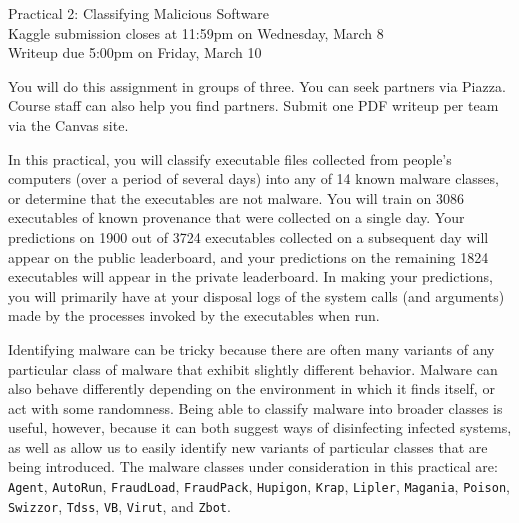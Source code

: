 \documentclass[12pt]{article}
\begin{document}
\begin{center}
{\Large Practical 2: Classifying Malicious Software}\\
Kaggle submission closes at 11:59pm on Wednesday, March 8\\
Writeup due 5:00pm on Friday, March 10
\end{center}

You will do this assignment in groups of three. You can seek partners via Piazza.  Course staff can also help you find partners.  Submit one PDF writeup per team via the Canvas site.

In this practical, you will classify executable files collected from people's computers (over a period of several days) into any of 14 known malware classes, or determine that the executables are not malware.  You will train on 3086 executables of known provenance that were collected on a single day. Your predictions on 1900 out of 3724 executables collected on a subsequent day will appear on the public leaderboard, and your predictions on the remaining 1824 executables will appear in the private leaderboard. In making your predictions, you will primarily have at your disposal logs of the system calls (and arguments) made by the processes invoked by the executables when run.

Identifying malware can be tricky because there are often many variants of any particular class of malware that exhibit slightly different behavior. Malware can also behave differently depending on the environment in which it finds itself, or act with some randomness. Being able to classify malware into broader classes is useful, however, because it can both suggest ways of disinfecting infected systems, as well as allow us to easily identify new variants of particular classes that are being introduced. The malware classes under consideration in this practical are: \texttt{Agent}, \texttt{AutoRun}, \texttt{FraudLoad}, \texttt{FraudPack}, \texttt{Hupigon}, \texttt{Krap}, \texttt{Lipler}, \texttt{Magania}, \texttt{Poison}, \texttt{Swizzor}, \texttt{Tdss}, \texttt{VB}, \texttt{Virut}, and \texttt{Zbot}.
\end{document}
